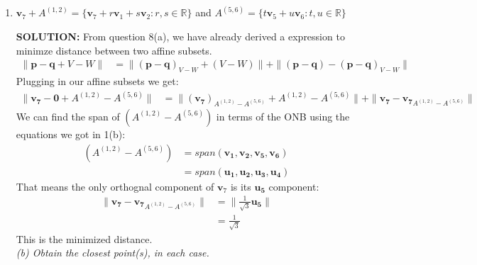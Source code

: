 \documentclass[12pt]{article}
\begin{document}
\begin{enumerate}
\begin{enumerate}
              \item[(ii)] $\mathbf{v}_7 + A^{(1,2)} = \{\mathbf{v}_7 + r\mathbf{v}_1 + s\mathbf{v}_2 : r, s \in \mathbb{R}\}$ and $A^{(5,6)} = \{t\mathbf{v}_5 + u\mathbf{v}_6 : t, u \in \mathbb{R}\}$

                    \textbf{SOLUTION:}
                    From question 8(a), we have already derived a expression to minimze distance between two affine subsets.
                    \begin{align*}
                        \| \mathbf{p}-\mathbf{q} + V - W \| & = \| (\mathbf{p}-\mathbf{q})_{V-W} + (V - W)\| + \|(\mathbf{p}-\mathbf{q})-(\mathbf{p}-\mathbf{q})_{V-W} \|
                    \end{align*}
                    Plugging in our affine subsets we get:
                    \begin{align*}
                        \| \mathbf{v_7}-\mathbf{0} + A^{(1,2)} - A^{(5,6)} \| & =
                        \| (\mathbf{\mathbf{v_7}})_{A^{(1,2)}-A^{(5,6)}}  + A^{(1,2)} - A^{(5,6)}\| + \|\mathbf{v_7}-\mathbf{v_7}_{A^{(1,2)}-A^{(5,6)}} \|
                    \end{align*}
                    We can find the span of $(A^{(1,2)}-A^{(5,6)})$ in terms of the ONB using the equations we got in 1(b):
                    \begin{align*}
                        (A^{(1,2)}-A^{(5,6)}) & = span(\mathbf{v_1,v_2,v_5,v_6}) \\
                                              & = span(\mathbf{u_1,u_2,u_3,u_4})
                    \end{align*}
                    That means the only orthognal component of $\mathbf{v}_7$ is its $\mathbf{u_5}$ component:
                    \begin{align*}
                        \|\mathbf{v_7}-\mathbf{v_7}_{A^{(1,2)}-A^{(5,6)}} \| & = \| \tfrac{1}{\sqrt{3}}\mathbf{u_5} \| \\
                                                                             & = \tfrac{1}{\sqrt{3}}
                    \end{align*}
                    This is the minimized distance. \\

                    \emph{(b) Obtain the closest point(s), in each case.}


\end{enumerate}
\end{enumerate}
\end{document}

